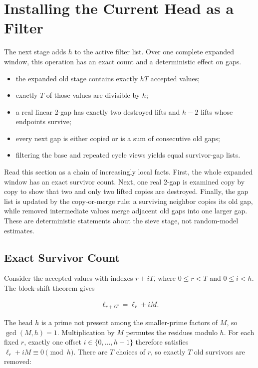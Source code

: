 \section{Installing the Current Head as a Filter}
\label{sec:installing-current-head-as-filter}

The next stage adds $h$ to the active filter list. Over one complete
expanded window, this operation has an exact count and a deterministic
effect on gaps.

\begin{itemize}
  \item the expanded old stage contains exactly $hT$ accepted values;
  \item exactly $T$ of those values are divisible by $h$;
  \item a real linear 2-gap has exactly two destroyed lifts and $h-2$
    lifts whose endpoints survive;
  \item every next gap is either copied or is a sum of consecutive old
    gaps;
  \item filtering the base and repeated cycle views yields equal
    survivor-gap lists.
\end{itemize}

Read this section as a chain of increasingly local facts. First, the
whole expanded window has an exact survivor count. Next, one real 2-gap
is examined copy by copy to show that two and only two lifted copies are
destroyed. Finally, the gap list is updated by the copy-or-merge rule: a
surviving neighbor copies its old gap, while removed intermediate values
merge adjacent old gaps into one larger gap. These are deterministic
statements about the sieve stage, not random-model estimates.

\subsection{Exact Survivor Count}
\label{sec:exact-survivor-count}

Consider the accepted values with indexes $r+iT$, where $0\le r\lt T$ and
$0\le i\lt h$. The block-shift theorem gives

\begin{equation*}
\begin{aligned}
\ell_{r+iT}=\ell_r+iM.
\end{aligned}
\end{equation*}

The head $h$ is a prime not present among the smaller-prime factors of
$M$, so $\gcd(M,h)=1$. Multiplication by $M$ permutes the residues modulo
$h$. For each fixed $r$, exactly one offset $i\in\{0,\ldots,h-1\}$
therefore satisfies $\ell_r+iM\equiv0\pmod h$. There are $T$ choices of
$r$, so exactly $T$ old survivors are removed:

